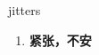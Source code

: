 
\begin{frame}
{\huge jitters}
\begin{center}
\begin{enumerate}\Large
  \item \textbf{紧张，不安}
\end{enumerate}
\end{center}
\end{frame}

